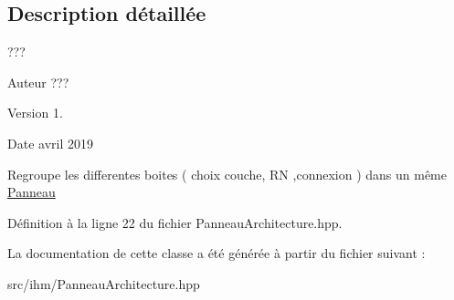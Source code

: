 \subsection{Description détaillée}
??? 

\begin{DoxyAuthor}{Auteur}
??? 
\end{DoxyAuthor}
\begin{DoxyVersion}{Version}
1. 
\end{DoxyVersion}
\begin{DoxyDate}{Date}
avril 2019
\end{DoxyDate}
Regroupe les differentes boites ( choix couche, RN ,connexion ) dans un même \hyperlink{class_panneau}{Panneau} 

Définition à la ligne 22 du fichier Panneau\+Architecture.\+hpp.



La documentation de cette classe a été générée à partir du fichier suivant \+:\begin{DoxyCompactItemize}
\item 
src/ihm/Panneau\+Architecture.\+hpp\end{DoxyCompactItemize}
